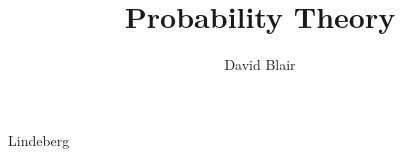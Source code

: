\documentclass{amsbook}
\theoremstyle{definition}
\theoremstyle{remark}
\begin{document}
\frontmatter
\title{Probability Theory}
\author{David Blair}
\maketitle

\mainmatter

\tableofcontents











 {Lindeberg}


































\end{document}
